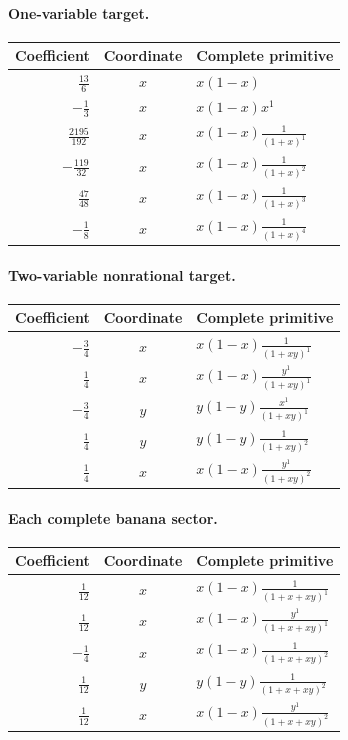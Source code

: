 \paragraph{One-variable target.}
\begin{center}\begin{tabular}{@{}rcl@{}}
\toprule Coefficient & Coordinate & Complete primitive \\ \midrule
$\frac{13}{6}$ & $x$ & $x(1-x)$ \\
$-\frac{1}{3}$ & $x$ & $x(1-x)x^{1}$ \\
$\frac{2195}{192}$ & $x$ & $x(1-x)\frac{1}{(1+x)^{1}}$ \\
$-\frac{119}{32}$ & $x$ & $x(1-x)\frac{1}{(1+x)^{2}}$ \\
$\frac{47}{48}$ & $x$ & $x(1-x)\frac{1}{(1+x)^{3}}$ \\
$-\frac{1}{8}$ & $x$ & $x(1-x)\frac{1}{(1+x)^{4}}$ \\
\bottomrule\end{tabular}\end{center}
\paragraph{Two-variable nonrational target.}
\begin{center}\begin{tabular}{@{}rcl@{}}
\toprule Coefficient & Coordinate & Complete primitive \\ \midrule
$-\frac{3}{4}$ & $x$ & $x(1-x)\frac{1}{(1+xy)^{1}}$ \\
$\frac{1}{4}$ & $x$ & $x(1-x)\frac{y^{1}}{(1+xy)^{1}}$ \\
$-\frac{3}{4}$ & $y$ & $y(1-y)\frac{x^{1}}{(1+xy)^{1}}$ \\
$\frac{1}{4}$ & $y$ & $y(1-y)\frac{1}{(1+xy)^{2}}$ \\
$\frac{1}{4}$ & $x$ & $x(1-x)\frac{y^{1}}{(1+xy)^{2}}$ \\
\bottomrule\end{tabular}\end{center}
\paragraph{Each complete banana sector.}
\begin{center}\begin{tabular}{@{}rcl@{}}
\toprule Coefficient & Coordinate & Complete primitive \\ \midrule
$\frac{1}{12}$ & $x$ & $x(1-x)\frac{1}{(1+x+xy)^{1}}$ \\
$\frac{1}{12}$ & $x$ & $x(1-x)\frac{y^{1}}{(1+x+xy)^{1}}$ \\
$-\frac{1}{4}$ & $x$ & $x(1-x)\frac{1}{(1+x+xy)^{2}}$ \\
$\frac{1}{12}$ & $y$ & $y(1-y)\frac{1}{(1+x+xy)^{2}}$ \\
$\frac{1}{12}$ & $x$ & $x(1-x)\frac{y^{1}}{(1+x+xy)^{2}}$ \\
\bottomrule\end{tabular}\end{center}
